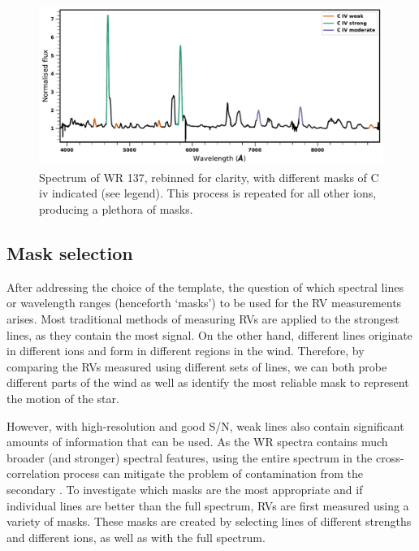 \begin{figure}
    \centering
    \includegraphics[width=\hsize]{chapters/WC/image/LineStrengths.pdf}
    \caption{Spectrum of WR 137, rebinned for clarity, with different masks of C iv indicated (see legend). This process is repeated for all other ions, producing a plethora of masks.}
    \label{fig:line_strengths}
\end{figure}
\subsection{Mask selection}
After addressing the choice of the template, the question of which spectral lines or wavelength ranges (henceforth `masks') to be used for the RV measurements arises. Most traditional methods of measuring RVs are applied to the strongest lines, as they contain the most signal. 
On the other hand, different lines originate in different ions and form in different regions in the wind. Therefore, by comparing the RVs measured using different sets of lines, we can both probe different parts of the wind as well as identify the most reliable mask to represent the motion of the star.

However, with high-resolution and good S/N, weak lines also contain significant amounts of information that can be used. As the WR spectra contains much broader (and stronger) spectral features, using the entire spectrum in the cross-correlation process can mitigate the problem of contamination from the secondary \citep{david-uraz_using_2012}. To investigate which masks are the most appropriate and if individual lines are better than the full spectrum, RVs are first measured using a variety of masks. These masks are created by selecting lines of different strengths and different ions, as well as with the full spectrum.

